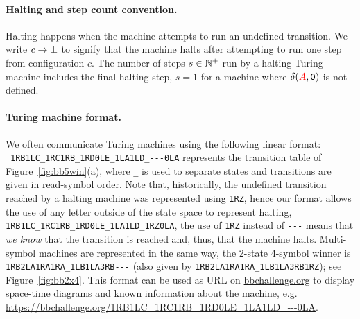 \vspace{-1ex}
\paragraph{Halting and step count convention.} Halting happens when the machine attempts to run an undefined transition. We write $c \to \bot$ to signify that the machine halts after attempting to run one step from configuration $c$. The number of steps $s\in \mathbb{N}^+$ run by a halting Turing machine includes the final halting step, \eg $s = 1$ for a machine where $\delta(\stateA,\symbolzero)$ is not defined.



\vspace{-1ex}
\paragraph*{Turing machine format.} We often communicate Turing machines using the following linear format: \\ \verb|1RB1LC_1RC1RB_1RD0LE_1LA1LD_---0LA| represents the transition table of Figure~\ref{fig:bb5win}(a), where \texttt{\_} is used to separate states and transitions are given in read-symbol order. Note that, historically, the undefined transition reached by a halting machine was represented using \texttt{1RZ}, hence our format allows the use of any letter outside of the state space to represent halting, \eg \texttt{1RB1LC\_1RC1RB\_1RD0LE\_1LA1LD\_1RZ0LA}, the use of \texttt{1RZ} instead of \verb|---| means that \textit{we know} that the transition is reached and, thus, that the machine halts. Multi-symbol machines are represented in the same way, \eg the 2-state 4-symbol \BBfull winner is \verb|1RB2LA1RA1RA_1LB1LA3RB---| (also given by \texttt{1RB2LA1RA1RA\_1LB1LA3RB1RZ}); see Figure~\ref{fig:bb2x4}. This format can be used as URL on \url{bbchallenge.org} to display space-time diagrams and known information about the machine, e.g. \url{https://bbchallenge.org/1RB1LC\_1RC1RB\_1RD0LE\_1LA1LD\_---0LA}.

